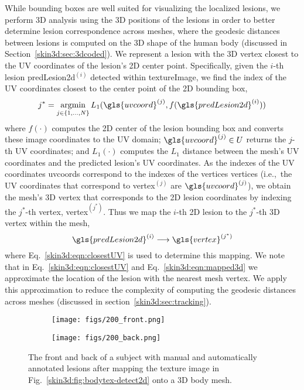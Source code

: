 \documentclass[journal]{IEEEtran}
\DeclareMathOperator*{\argmin}{argmin}
\def\ie{i.e.,~}
\begin{document}
While bounding boxes are well suited for visualizing the localized lesions, we perform 3D analysis using the 3D positions of the lesions in order to better determine lesion correspondence across meshes, where the geodesic distances between lesions is computed on the 3D shape of the human body (discussed in Section~\ref{skin3d:sec:3dcoded}). We represent a lesion with the 3D vertex closest to the UV coordinates of the lesion's 2D center point. Specifically, given the $i$-th lesion \gls{predLesion2d}$^{(i)}$ detected within \gls{textureImage}, we find the index of the UV coordinates closest to the center point of the 2D bounding box,
\begin{equation}
    j^* = \argmin_{j \in \{1, \dots, N \}} L_1(\gls{uvcoord}^{(j)}, f(\gls{predLesion2d}^{(i)}))
    \label{skin3d:eqn:closestUV}
\end{equation}
where $f(\cdot)$ computes the 2D center of the lesion bounding box and converts these image coordinates to the UV domain; $\gls{uvcoord}^{(j)} \in U$ returns the $j$-th UV coordinates; and $L_1(\cdot)$ computes the $L_1$ distance between the mesh's UV coordinates and the predicted lesion's UV coordinates. As the indexes of the UV coordinates \gls{uvcoords} correspond to the indexes of the vertices \gls{vertices} (\ie the UV coordinates that correspond to \gls{vertex}$^{(j)}$ are $\gls{uvcoord}^{(j)}$), we obtain the mesh's 3D vertex that corresponds to the 2D lesion coordinates by indexing the $j^*$-th vertex, \gls{vertex}$^{(j^*)}$. Thus we map the $i$-th 2D lesion to the $j^{*}$-th 3D vertex within the mesh,
\begin{equation}
    \gls{predLesion2d}^{(i)} \longrightarrow \gls{vertex}^{(j^*)}
    \label{skin3d:eqn:mapped3d}
\end{equation}
where Eq.~\ref{skin3d:eqn:closestUV} is used to determine this mapping. We note that in Eq.~\ref{skin3d:eqn:closestUV} and Eq.~\ref{skin3d:eqn:mapped3d} we approximate the location of the lesion with the nearest mesh vertex. We apply this approximation to reduce the complexity of computing the geodesic distances across meshes (discussed in section~\ref{skin3d:sec:tracking}). 

\begin{figure}[htb]
\centering
\begin{subfigure}[b]{0.50\linewidth}
\texttt{[image: figs/200\_front.png]}
\end{subfigure}
\begin{subfigure}[b]{0.47\linewidth}
\texttt{[image: figs/200\_back.png]}
\end{subfigure}
\caption{The front and back of a subject with manual and automatically annotated lesions after mapping the texture image in Fig.~\ref{skin3d:fig:bodytex-detect2d} onto a 3D body mesh.}
\label{skin3d:fig:bodytex-detect3d}
\end{figure}
\end{document}
